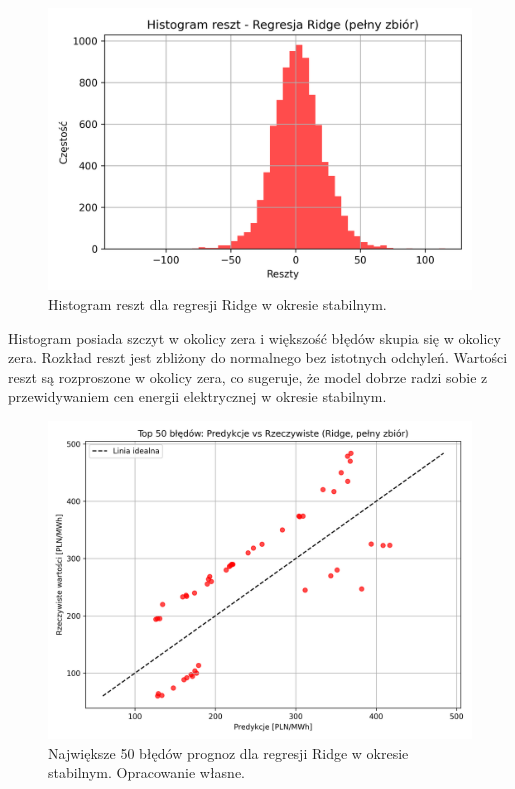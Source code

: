 \begin{figure}[H]
    \centering
    \includegraphics[width=1.0\textwidth]{../../plots/predicts/residuals_histogram_Ridge_full_stable_period.png}
    \caption{Histogram reszt dla regresji Ridge w okresie stabilnym.}
    \label{fig:ridge_residuals_stable_period}
\end{figure}

Histogram posiada szczyt w okolicy zera i większość błędów skupia się w okolicy zera. Rozkład reszt jest zbliżony do normalnego bez istotnych odchyleń. Wartości reszt są rozproszone w okolicy zera, co sugeruje, że model dobrze radzi sobie z przewidywaniem cen energii elektrycznej w okresie stabilnym.

\begin{figure}[H]
    \centering
    \includegraphics[width=1.0\textwidth]{../../plots/predicts/top_50_errors_Ridge_full_stable_period.png}
    \caption{Największe 50 błędów prognoz dla regresji Ridge w okresie stabilnym. Opracowanie własne.}
    \label{fig:top_50_errors_Ridge_full_stable_period}
\end{figure}

